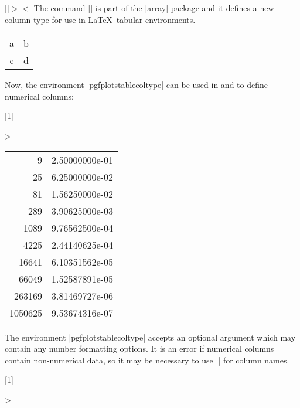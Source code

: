 \begin{command}{\newcolumntype{}[]$>$$<$}
The command |\newcolumntype| is part of the |array| package and it defines a new column type  for use in \LaTeX\ tabular environments.
\begin{codeexample}
\usepackage{array}
\end{codeexample}

\begin{codeexample}[]
\begin{tabular}{dl}
a & b \\
c & d \\
\end{tabular}
\end{codeexample}

Now, the environment |pgfplotstablecoltype| can be used in  and  to define numerical columns:
\begin{codeexample}[]
\newcolumntype{L}[1]
	{>{\begin{pgfplotstablecoltype}[#1]}r<{\end{pgfplotstablecoltype}}}

\begin{tabular}{L{int detect}L{sci,sci subscript,sci zerofill}}
9      & 2.50000000e-01\\
25     & 6.25000000e-02\\
81     & 1.56250000e-02\\
289    & 3.90625000e-03\\
1089   & 9.76562500e-04\\
4225   & 2.44140625e-04\\
16641  & 6.10351562e-05\\
66049  & 1.52587891e-05\\
263169 & 3.81469727e-06\\
1050625& 9.53674316e-07\\
\end{tabular}
\end{codeexample}
\noindent The environment |pgfplotstablecoltype| accepts an optional argument which may contain any number formatting options. It is an error if numerical columns contain non-numerical data, so it may be necessary to use |\multicolumn| for column names.

\begin{codeexample}[]
\newcolumntype{L}[1]
	{>{\begin{pgfplotstablecoltype}[#1]}r<{\end{pgfplotstablecoltype}}}


\end{codeexample}
\end{command}
